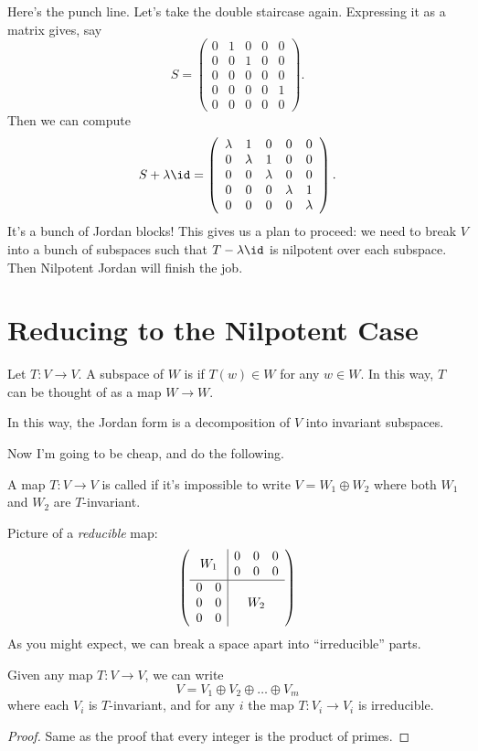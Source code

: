 Here's the punch line.
Let's take the double staircase again.
Expressing it as a matrix gives, say
\[
	S = \left(
	\begin{array}{ccccc}
		0 & 1 & 0 & 0 & 0 \\
		0 & 0 & 1 & 0 & 0 \\
		0 & 0 & 0 & 0 & 0 \\
		0 & 0 & 0 & 0 & 1 \\
		0 & 0 & 0 & 0 & 0
	\end{array}
	\right).
\]
Then we can compute
\[
	S + \lambda \id = \left(
	\begin{array}{ccccc}
		\lambda & 1 & 0 & 0 & 0 \\
		0 & \lambda & 1 & 0 & 0 \\
		0 & 0 & \lambda & 0 & 0 \\
		0 & 0 & 0 & \lambda & 1 \\
		0 & 0 & 0 & 0 & \lambda
	\end{array}
	\right).
\]
It's a bunch of Jordan blocks!
This gives us a plan to proceed: we need to break $V$ into
a bunch of subspaces such that $T - \lambda \id$ is nilpotent over each subspace.
Then Nilpotent Jordan will finish the job.

\section{Reducing to the Nilpotent Case}
\begin{definition}
	Let $T : V \to V$. A subspace of $W$ is 
	if $T(w) \in W$ for any $w \in W$.
	In this way, $T$ can be thought of as a map $W \to W$.
\end{definition}
In this way, the Jordan form is a decomposition of $V$ into invariant subspaces.

Now I'm going to be cheap, and do the following.
\begin{definition}
	A map $T : V \to V$ is called  if it's impossible to write $V = W_1 \oplus W_2$
	where both $W_1$ and $W_2$ are $T$-invariant.
\end{definition}
Picture of a \emph{reducible} map:
\[ 
	\left(
	\begin{array}{ccccc}
		\multicolumn{2}{c|}{\multirow{2}{*}{$W_1$}} & 0 & 0 & 0  \\ 
		\multicolumn{2}{c|}{} & 0 & 0 & 0 \\ \hline
		0 & 0 & \multicolumn{3}{|c}{\multirow{3}{*}{$W_2$}} \\
		0 & 0 & \multicolumn{3}{|c}{} \\
		0 & 0 & \multicolumn{3}{|c}{} 
	\end{array}
	\right)
\]
As you might expect, we can break a space apart into ``irreducible'' parts.
\begin{proposition}
	Given any map $T: V \to V$, we can write
	\[ V = V_1 \oplus V_2 \oplus \dots \oplus V_m \]
	where each $V_i$ is $T$-invariant, and for any $i$ the map $T : V_i \to V_i$ is irreducible.
\end{proposition}
\begin{proof}
	Same as the proof that every integer is the product of primes.
\end{proof}

